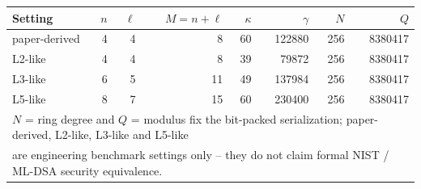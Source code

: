 \begin{tabular}{l r r r r r r r}
\hline
Setting & $n$ & $\ell$ & $M=n+\ell$ & $\kappa$ & $\gamma$ & $N$ & $Q$ \\
\hline
paper-derived & 4 & 4 & 8 & 60 & 122880 & 256 & 8380417 \\
L2-like & 4 & 4 & 8 & 39 & 79872 & 256 & 8380417 \\
L3-like & 6 & 5 & 11 & 49 & 137984 & 256 & 8380417 \\
L5-like & 8 & 7 & 15 & 60 & 230400 & 256 & 8380417 \\
\hline
\multicolumn{8}{l}{\footnotesize $N$ = ring degree and $Q$ = modulus fix the bit-packed serialization; paper-derived, L2-like, L3-like and L5-like} \\
\multicolumn{8}{l}{\footnotesize are engineering benchmark settings only -- they do not claim formal NIST / ML-DSA security equivalence.} \\
\hline
\end{tabular}
